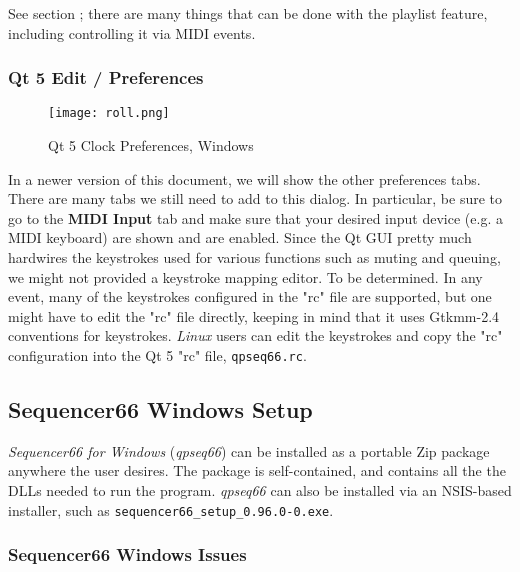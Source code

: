    See section ; there are many things that can be
   done with the playlist feature, including controlling it via MIDI events.

\subsubsection{Qt 5 Edit / Preferences}
\label{subsubsec:qt_portmidi_qt5_edit_prefs}

\begin{figure}[H]
   \centering 
   \texttt{[image: roll.png]}
   \caption{Qt 5 Clock Preferences, Windows}
   \label{fig:qt5_prefs_clock_windows}
\end{figure}

   In a newer version of this document, we will show the other preferences
   tabs.  There are many tabs we still need to add to this dialog.
   In particular, be sure to go to the \textbf{MIDI Input} tab and
   make sure that your desired input device (e.g. a MIDI keyboard) are shown
   and are enabled.
   Since the Qt GUI pretty much hardwires the keystrokes used for various
   functions such as muting and queuing, we might not provided a keystroke
   mapping editor.  To be determined.
   In any event, many of the keystrokes configured in the "rc" file are
   supported, but one might have to edit the "rc" file directly, keeping
   in mind that it uses Gtkmm-2.4 conventions for keystrokes.
   \textsl{Linux} users can edit the keystrokes and copy the "rc" configuration
   into the Qt 5 "rc" file, \texttt{qpseq66.rc}.

\subsection{Sequencer66 Windows Setup}
\label{subsec:qt_portmidi_windows_setup}

   \textsl{Sequencer66 for Windows} (\textsl{qpseq66}) can be installed
   as a portable Zip package anywhere the user desires.  The package is
   self-contained, and contains all the the DLLs needed to run the program.
   \textsl{qpseq66} can also be installed via an NSIS-based installer,
   such as \texttt{sequencer66\_setup\_0.96.0-0.exe}.

\subsubsection{Sequencer66 Windows Issues}
\label{subsubsec:qt_portmidi_windows_setup_issues}

